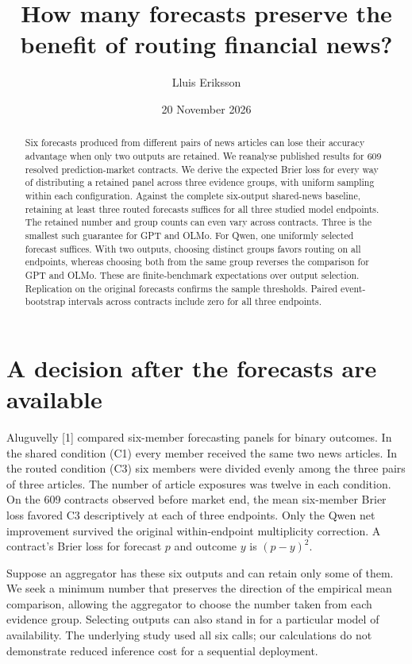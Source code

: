 \documentclass[11pt]{article}
\title{How many forecasts preserve the benefit of routing financial news?}
\author{Lluis Eriksson}
\date{20 November 2026}
\begin{document}
\maketitle
\begin{abstract}
Six forecasts produced from different pairs of news articles can lose their accuracy advantage when only two outputs are retained. We reanalyse published results for 609 resolved prediction-market contracts. We derive the expected Brier loss for every way of distributing a retained panel across three evidence groups, with uniform sampling within each configuration. Against the complete six-output shared-news baseline, retaining at least three routed forecasts suffices for all three studied model endpoints. The retained number and group counts can even vary across contracts. Three is the smallest such guarantee for GPT and OLMo. For Qwen, one uniformly selected forecast suffices. With two outputs, choosing distinct groups favors routing on all endpoints, whereas choosing both from the same group reverses the comparison for GPT and OLMo. These are finite-benchmark expectations over output selection. Replication on the original forecasts confirms the sample thresholds. Paired event-bootstrap intervals across contracts include zero for all three endpoints.
\end{abstract}

\section{A decision after the forecasts are available}
Aluguvelly [1] compared six-member forecasting panels for binary outcomes. In the shared condition (C1) every member received the same two news articles. In the routed condition (C3) six members were divided evenly among the three pairs of three articles. The number of article exposures was twelve in each condition. On the 609 contracts observed before market end, the mean six-member Brier loss favored C3 descriptively at each of three endpoints. Only the Qwen net improvement survived the original within-endpoint multiplicity correction. A contract's Brier loss for forecast $p$ and outcome $y$ is $(p-y)^2$.

Suppose an aggregator has these six outputs and can retain only some of them. We seek a minimum number that preserves the direction of the empirical mean comparison, allowing the aggregator to choose the number taken from each evidence group. Selecting outputs can also stand in for a particular model of availability. The underlying study used all six calls; our calculations do not demonstrate reduced inference cost for a sequential deployment.
\newpage
\end{document}

